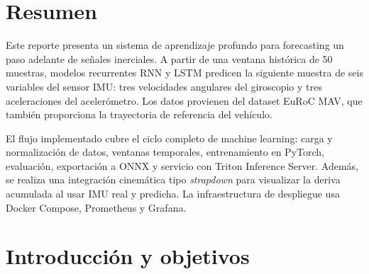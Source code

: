 \documentclass[11pt,a4paper]{article}
\begin{document}
\begin{titlepage}
\end{titlepage}
\setcounter{page}{1}
\pagestyle{plain}

\tableofcontents
\clearpage
\listoffigures
\clearpage

\section{Resumen}

Este reporte presenta un sistema de aprendizaje profundo para forecasting
un paso adelante de se\~nales inerciales. A partir de una ventana hist\'orica de
50 muestras, modelos recurrentes RNN y LSTM predicen la siguiente muestra de
seis variables del sensor IMU: tres velocidades angulares del giroscopio y
tres aceleraciones del aceler\'ometro. Los datos provienen del dataset EuRoC
MAV, que tambi\'en proporciona la trayectoria de referencia del veh\'iculo.

El flujo implementado cubre el ciclo completo de machine learning: carga y
normalizaci\'on de datos, ventanas temporales, entrenamiento en PyTorch,
evaluaci\'on, exportaci\'on a ONNX y servicio con Triton Inference Server.
Adem\'as, se realiza una integraci\'on cinem\'atica tipo \emph{strapdown} para
visualizar la deriva acumulada al usar IMU real y predicha. La infraestructura
de despliegue usa Docker Compose, Prometheus y Grafana.

\section{Introducci\'on y objetivos}
\end{document}
